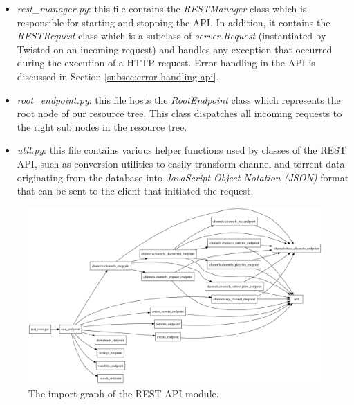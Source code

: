 \begin{itemize}
	\item \emph{rest\_manager.py}: this file contains the \emph{RESTManager} class which is responsible for starting and stopping the API. In addition, it  contains the \emph{RESTRequest} class which is a subclass of \emph{server.Request} (instantiated by Twisted on an incoming request) and handles any exception that occurred during the execution of a HTTP request. Error handling in the API is discussed in Section  \ref{subsec:error-handling-api}.
	\item \emph{root\_endpoint.py}: this file hosts the \emph{RootEndpoint} class which represents the root node of our resource tree. This class dispatches all incoming requests to the right sub nodes in the resource tree.
	\item \emph{util.py}: this file contains various helper functions used by classes of the REST API, such as conversion utilities to easily transform channel and torrent data originating from the database into \emph{JavaScript Object Notation (JSON)} format that can be sent to the client that initiated the request.
\end{itemize}

\begin{figure}[h!]
	\centering
	\includegraphics[width=1.0\columnwidth]{images/improving_qa/importgraph_api}
	\caption{The import graph of the REST API module.}
	\label{fig:importgraph-api}
\end{figure}

